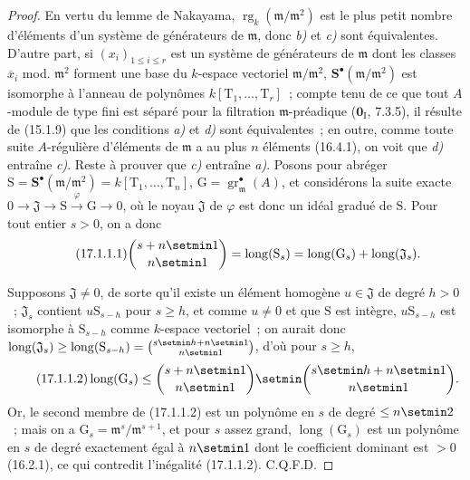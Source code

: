 \begin{proof}
En vertu du lemme de Nakayama,
$\operatorname{rg}_k(\mathfrak{m}/\mathfrak{m}^2)$ est le plus petit nombre
d'éléments d'un système de générateurs de $\mathfrak{m}$, donc \emph{b)} et \emph{c)} sont
équivalentes. D'autre part, si $(x_i)_{1\leq i\leq r}$ est un système de
générateurs de $\mathfrak{m}$ dont les classes $\overline{x}_i$ mod.
$\mathfrak{m}^2$ forment une base du $k$-espace vectoriel
$\mathfrak{m}/\mathfrak{m}^2$, $\mathbf{S}^\bullet(\mathfrak{m}/\mathfrak{m}^2)$
est isomorphe à l'anneau de
polynômes $k[\mathrm{T}_1,\ldots,\mathrm{T}_r]$~; compte tenu de ce que tout
$A$-module de type fini est séparé pour la filtration $\mathfrak{m}$-préadique
($\mathbf{0}_{\mathrm I}$, 7.3.5), il résulte de (15.1.9) que les conditions \emph{a)} et \emph{d)}
sont équivalentes~; en outre, comme toute suite $A$-régulière d'éléments de
$\mathfrak{m}$ a au plus $n$ éléments (16.4.1), on voit que \emph{d)} entraîne \emph{c)}.
Reste à prouver que \emph{c)} entraîne \emph{a)}.
Posons pour abréger
$\mathrm{S}=\mathbf{S}^\bullet(\mathfrak{m}/\mathfrak{m}^2)
=k[\mathrm{T}_1,\ldots,\mathrm{T}_n]$,
$\mathrm{G}=\operatorname{gr}^\bullet_{\mathfrak{m}}(A)$, et considérons la suite
exacte
$0\longrightarrow\mathfrak{J}\longrightarrow\mathrm{S}
\xrightarrow{\varphi}\mathrm{G}\longrightarrow0$, où le noyau
$\mathfrak{J}$ de $\varphi$ est donc un idéal gradué de $\mathrm{S}$. Pour
tout entier $s>0$, on a donc
\begin{equation}
\label{0.17.1.1.1-fr}
\tag{17.1.1.1}
  \binom{s+n\setmin 1}{n\setmin 1}
  =\operatorname{long}(\mathrm{S}_s)
  =\operatorname{long}(\mathrm{G}_s)
  +\operatorname{long}(\mathfrak{J}_s).
\end{equation}

Supposons $\mathfrak{J}\neq0$, de sorte qu'il existe un élément homogène
$u\in\mathfrak{J}$ de degré $h>0$~; $\mathfrak{J}_s$ contient
$u\mathrm{S}_{s-h}$ pour $s\geq h$, et comme $u\neq0$ et que $\mathrm{S}$ est
intègre, $u\mathrm{S}_{s-h}$ est isomorphe à $\mathrm{S}_{s-h}$ comme
$k$-espace vectoriel~; on aurait donc
$\operatorname{long}(\mathfrak{J}_s)\geq
\operatorname{long}(\mathrm{S}_{s-h})=\binom{s\setmin h+n\setmin 1}{n\setmin 1}$, d'où pour
$s\geq h$,
\begin{equation}
\label{0.17.1.1.2-fr}
\tag{17.1.1.2}
  \operatorname{long}(\mathrm{G}_s)
  \leq\binom{s+n\setmin 1}{n\setmin 1}\setmin\binom{s\setmin h+n\setmin 1}{n\setmin 1}.
\end{equation}
Or, le second membre de (17.1.1.2) est un polynôme en $s$ de degré
$\leq n\setmin 2$~; mais on a
$\mathrm{G}_s=\mathfrak{m}^s/\mathfrak{m}^{s+1}$, et pour $s$ assez grand,
$\operatorname{long}(\mathrm{G}_s)$ est un polynôme en $s$ de degré exactement
égal à $n\setmin 1$ dont le coefficient dominant est $>0$ (16.2.1), ce qui contredit
l'inégalité (17.1.1.2). C.Q.F.D.
\end{proof}

